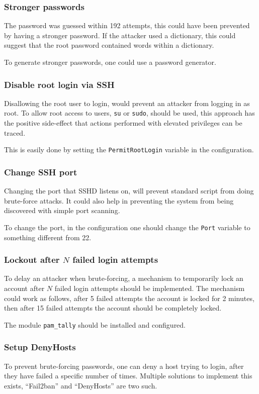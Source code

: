 \subsubsection{Stronger passwords}
The password was guessed within 192 attempts, this could have been prevented by
having a stronger password. If the attacker used a dictionary, this could
suggest that the root password contained words within a dictionary.

To generate stronger passwords, one could use a password generator.

\subsubsection{Disable root login via SSH}
Disallowing the root user to login, would prevent an attacker from logging in
as root. To allow root access to users, {\tt su} or {\tt sudo}, should be used,
this approach has the positive side-effect that actions performed with elevated
privileges can be traced.

This is easily done by setting the \texttt{PermitRootLogin} variable in the 
configuration.

\subsubsection{Change SSH port}
Changing the port that SSHD listens on, will prevent standard script from doing
brute-force attacks. It could also help in preventing the system from being
discovered with simple port scanning.

To change the port, in the configuration one should change the \texttt{Port}
variable to something different from 22.

\subsubsection{Lockout after $N$ failed login attempts}
To delay an attacker when brute-forcing, a mechanism to temporarily lock an 
account after $N$ failed login attempts should be implemented. The mechanism
could work as follows, after 5 failed attempts the account is locked for 2
minutes, then after 15 failed attempts the account should be completely locked.

The module \texttt{pam\_tally} should be installed and configured.

\subsubsection{Setup DenyHosts}
To prevent brute-forcing passwords, one can deny a host trying to login, after
they have failed a specific number of times. Multiple solutions to implement
this exists, ``Fail2ban'' and ``DenyHosts'' are two such.

